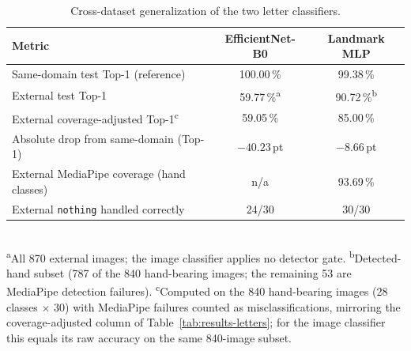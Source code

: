 \begin{table}[!ht]
\centering
\caption{Cross-dataset generalization of the two letter classifiers.}
\label{tab:results-letters-external}
\begin{tabular}{lcc}
\toprule
\textbf{Metric} & \textbf{EfficientNet-B0} & \textbf{Landmark MLP} \\
\midrule
Same-domain test Top-1 (reference)              & 100.00\,\% & 99.38\,\% \\
External test Top-1                             & 59.77\,\%\textsuperscript{a} & 90.72\,\%\textsuperscript{b} \\
External coverage-adjusted Top-1\textsuperscript{c} & 59.05\,\% & 85.00\,\% \\
Absolute drop from same-domain (Top-1)         & $-40.23$\,pt & $-8.66$\,pt \\
External MediaPipe coverage (hand classes)     & n/a         & 93.69\,\% \\
External \texttt{nothing} handled correctly    & 24/30       & 30/30 \\
\bottomrule
\end{tabular}
\\[0.4em]
\footnotesize\textsuperscript{a}All \num{870} external images; the image classifier applies no detector gate.
\textsuperscript{b}Detected-hand subset (787 of the 840 hand-bearing images; the remaining 53 are MediaPipe detection failures).
\textsuperscript{c}Computed on the 840 hand-bearing images (28 classes $\times$ 30) with MediaPipe failures counted as misclassifications, mirroring the coverage-adjusted column of Table~\ref{tab:results-letters}; for the image classifier this equals its raw accuracy on the same 840-image subset.
\end{table}

